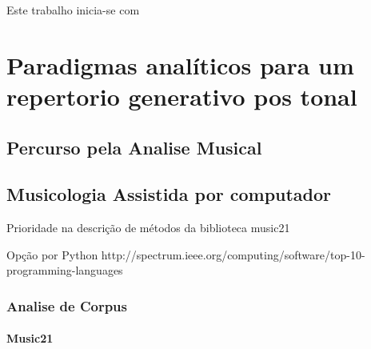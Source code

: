 \documentclass[
	12pt,				%
	openright,			%
	twoside,			%
	a4paper,			%
	english,			%
	french,				%
	spanish,			%
	brazil				%
	]{abntex2}
\begin{document}

\tableofcontents*
\cleardoublepage

%
%
%
%
%
%
%
\textual


Este trabalho inicia-se com 

\part{Paradigmas analíticos para um repertorio generativo pos tonal}


\chapter{Percurso pela Analise Musical }




\chapter{Musicologia Assistida por computador}

Prioridade na descrição de métodos da biblioteca music21

Opção por Python http://spectrum.ieee.org/computing/software/top-10-programming-languages 


\section{Analise de Corpus}

\subsection{Music21}
\end{document}
